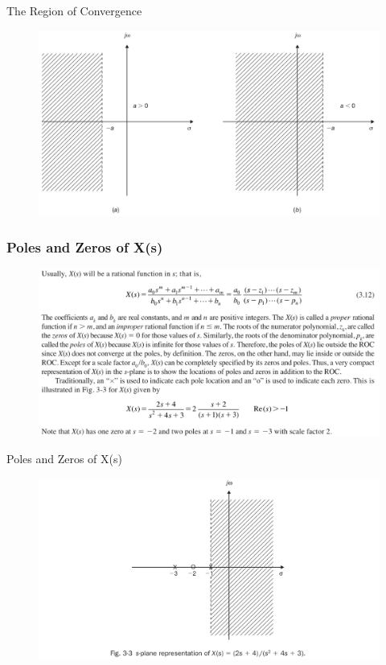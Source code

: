 \documentclass[pdflatex,compress,mathserif]{beamer}
\begin{document}
\begin{frame}{The Region of Convergence}
	\begin{figure}
		\centering
		\includegraphics[width=\linewidth]{img/img08}
	\end{figure}
\end{frame}

\begin{frame}
	\frametitle{Poles and Zeros of X(s)}
	\begin{figure}
		\centering
		\includegraphics[width=\linewidth]{img/img09}
	\end{figure}
\end{frame}

\begin{frame}{Poles and Zeros of X(s)}
	\begin{figure}
		\centering
		\includegraphics[width=\linewidth]{img/img10}
	\end{figure}
\end{frame}
\end{document}
